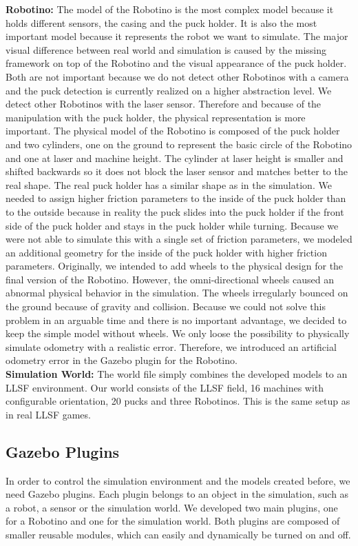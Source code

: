 \textbf{Robotino:} The model of the Robotino is the most complex model because it holds different sensors, the casing and the puck holder. It is also the most important model because it represents the robot we want to simulate. The major visual difference between real world and simulation is caused by the missing framework on top of the Robotino and the visual appearance of the puck holder. Both are not important because we do not detect other Robotinos with a camera and the puck detection is currently realized on a higher abstraction level. We detect other Robotinos with the laser sensor. Therefore and because of the manipulation with the puck holder, the physical representation is more important. The physical model of the Robotino is composed of the puck holder and two cylinders, one on the ground to represent the basic circle of the Robotino and one at laser and machine height. The cylinder at laser height is smaller and shifted backwards so it does not block the laser sensor and matches better to the real shape. The real puck holder has a similar shape as in the simulation. We needed to assign higher friction parameters to the inside of the puck holder than to the outside because in reality the puck slides into the puck holder if the front side of the puck holder and stays in the puck holder while turning. Because we were not able to simulate this with a single set of friction parameters, we modeled an additional geometry for the inside of the puck holder with higher friction parameters. Originally, we intended to add wheels to the physical design for the final version of the Robotino. However, the omni-directional wheels caused an abnormal physical behavior in the simulation. The wheels irregularly bounced on the ground because of gravity and collision. Because we could not solve this problem in an arguable time and there is no important advantage, we decided to keep the simple model without wheels. We only loose the possibility to physically simulate odometry with a realistic error. Therefore, we introduced an artificial odometry error in the Gazebo plugin for the Robotino.\\
\textbf{Simulation World:} The world file simply combines the developed models to an LLSF environment. Our world consists of the LLSF field, 16 machines with configurable orientation, 20 pucks and three Robotinos. This is the same setup as in real LLSF games.\\


\subsection{Gazebo Plugins}
In order to control the simulation environment and the models created before, we need Gazebo plugins. Each plugin belongs to an object in the simulation, such as a robot, a sensor or the simulation world. We developed two main plugins, one for a Robotino and one for the simulation world. Both plugins are composed of smaller reusable modules, which can easily and dynamically be turned on and off.

